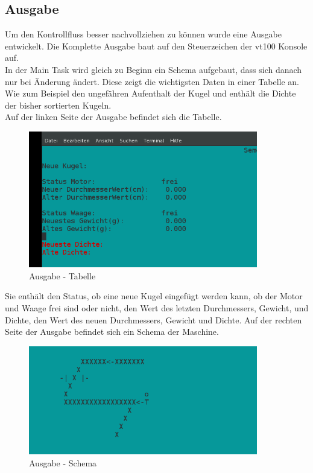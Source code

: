 \documentclass[12pt,a4paper]{article}
\begin{document}
\subsection{Ausgabe}
Um den Kontrollfluss besser nachvollziehen zu können wurde eine Ausgabe entwickelt.
Die Komplette Ausgabe baut auf den Steuerzeichen der vt100 Konsole auf.\\
In der Main Task wird gleich zu Beginn ein Schema aufgebaut, dass sich danach nur bei Änderung ändert.
Diese zeigt die wichtigsten Daten in einer Tabelle an.\\
Wie zum Beispiel den ungefähren Aufenthalt der Kugel und enthält die Dichte der bisher sortierten Kugeln.\\
Auf der linken Seite der Ausgabe befindet sich die Tabelle.\\
\begin{figure}[h]
\begin{center}
\includegraphics[width=10cm]{grafiken/Ausgabe_tabelle.png}
\caption{Ausgabe - Tabelle}
\label{Ausgabe}
\end{center}
\end{figure}
Sie enthält den Status, ob eine neue Kugel eingefügt werden kann, ob der Motor und Waage frei sind oder nicht, den Wert des letzten Durchmessers, Gewicht, und Dichte, den Wert des neuen Durchmessers, Gewicht und Dichte.
\newpage
\noindent
Auf der rechten Seite der Ausgabe befindet sich ein Schema der Maschine.
\begin{figure}[h]
\begin{center}
\includegraphics[width=10cm]{grafiken/Ausgabe_Schema.png}
\caption{Ausgabe - Schema}
\label{Ausgabe}
\end{center}
\end{figure}
\end{document}

